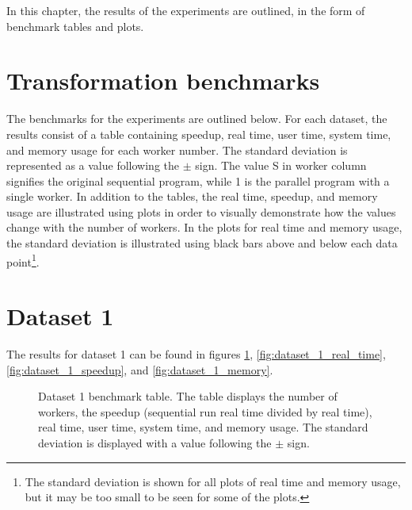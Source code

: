 In this chapter, the results of the experiments are outlined, in the form of benchmark tables and plots.

\section{Transformation benchmarks}
The benchmarks for the experiments are outlined below. For each dataset, the results consist of a table containing
speedup, real time, user time, system time, and memory usage for each worker number. The standard deviation is represented
as a value following the $\pm$ sign. The value S in worker column signifies the original sequential program, while 1 is the
parallel program with a single worker. In addition to the tables, the real time, speedup, and memory usage are illustrated
using plots in order to visually demonstrate how the values change with the number of workers. In the plots for real time
and memory usage, the standard deviation is illustrated using black bars above and below each data point\footnote{
The standard deviation is shown for all plots of real time and memory usage, but it may be too small to be seen for some of the plots.}.

\section{Dataset 1}
The results for dataset 1 can be found in figures \ref{fig:dataset_1_table}, \ref{fig:dataset_1_real_time}, \ref{fig:dataset_1_speedup}, and \ref{fig:dataset_1_memory}.

\begin{figure}[ht]
\centering
{}
\caption[Dataset 1 benchmark table.]{Dataset 1 benchmark table. The table displays the number of workers, the speedup (sequential run real time divided by real time), real time,
user time, system time, and memory usage. The standard deviation is displayed with a value following the $\pm$ sign.}
\label{fig:dataset_1_table}
\end{figure}

